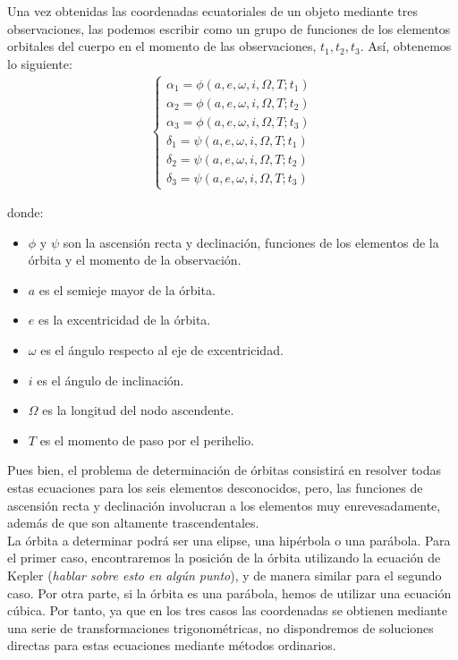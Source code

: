 \documentclass[11pt]{article}
\begin{document}
Una vez obtenidas las coordenadas ecuatoriales de un objeto mediante tres observaciones, las podemos escribir como un grupo de funciones de los elementos orbitales del cuerpo en el momento de las observaciones, $t_1, t_2, t_3$. Así, obtenemos lo siguiente:
\begin{align}
\left\{\begin{array}{l}
	\alpha_1 = \phi(a, e, \omega, i, \Omega, T; t_1)\\ 
	\alpha_2 = \phi(a, e, \omega, i, \Omega, T; t_2)\\ 
	\alpha_3 = \phi(a, e, \omega, i, \Omega, T; t_3)\\ 
	\delta_1 = \psi(a, e, \omega, i, \Omega, T; t_1)\\ 
	\delta_2 = \psi(a, e, \omega, i, \Omega, T; t_2)\\
	\delta_3 = \psi(a, e, \omega, i, \Omega, T; t_3)
\end{array}
\right.
\label{eq:ascension_declinacion}
\end{align}

\noindent donde:

\begin{itemize}
\item $\phi$ y $\psi$ son la ascensión recta y declinación, funciones de los elementos de la órbita y el momento de la observación.
\item $a$ es el semieje mayor de la órbita.
\item $e$ es la excentricidad de la órbita.
\item $\omega$ es el ángulo respecto al eje de excentricidad.
\item $i$ es el ángulo de inclinación.
\item $\Omega$ es la longitud del nodo ascendente.
\item $T$ es el momento de paso por el perihelio.
\end{itemize}

Pues bien, el problema de determinación de órbitas consistirá en resolver todas estas ecuaciones para los seis elementos desconocidos, pero, las funciones de ascensión recta y declinación involucran a los elementos muy enrevesadamente, además de que son altamente trascendentales.\\

La órbita a determinar podrá ser una elipse, una hipérbola o una parábola. Para el primer caso, encontraremos la posición de la órbita utilizando la ecuación de Kepler (\textit{hablar sobre esto en algún punto}), y de manera similar para el segundo caso. Por otra parte, si la órbita es una parábola, hemos de utilizar una ecuación cúbica. Por tanto, ya que en los tres casos las coordenadas se obtienen mediante una serie de transformaciones trigonométricas, no dispondremos de soluciones directas para estas ecuaciones mediante métodos ordinarios.\\
\end{document}
